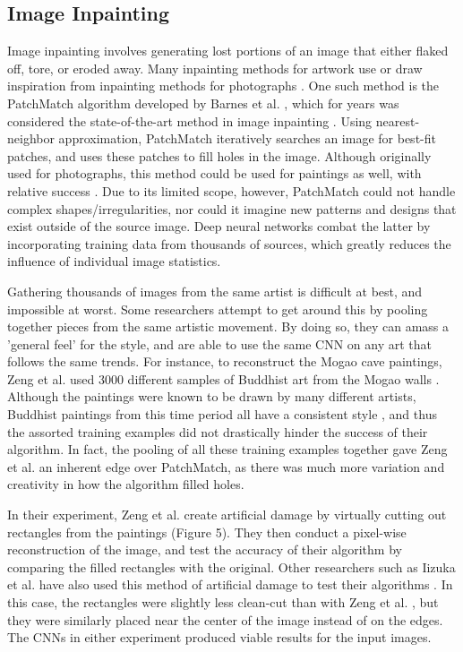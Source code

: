 \documentclass[a4paper,11pt]{article}
\begin{document}
\subsection{Image Inpainting}

Image inpainting involves generating lost portions of an image that either flaked off, tore, or eroded away. Many inpainting methods for artwork use or draw inspiration from inpainting methods for photographs \cite{gupta}. One such method is the PatchMatch algorithm developed by Barnes et al. \cite{barnes}, which for years was considered the state-of-the-art method in image inpainting \cite{gupta}. Using nearest-neighbor approximation, PatchMatch iteratively searches an image for best-fit patches, and uses these patches to fill holes in the image. Although originally used for photographs, this method could be used for paintings as well, with relative success \cite{gupta}. Due to its limited scope, however, PatchMatch could not handle complex shapes/irregularities, nor could it imagine new patterns and designs that exist outside of the source image. Deep neural networks combat the latter by incorporating training data from thousands of sources, which greatly reduces the influence of individual image statistics. 

Gathering thousands of images from the same artist is difficult at best, and impossible at worst. Some researchers attempt to get around this by pooling together pieces from the same artistic movement. By doing so, they can amass a 'general feel' for the style, and are able to use the same CNN on any art that follows the same trends. For instance, to reconstruct the Mogao cave paintings, Zeng et al. used 3000 different samples of Buddhist art from the Mogao walls \cite{zenggongzeng}. Although the paintings were known to be drawn by many different artists, Buddhist paintings from this time period all have a consistent style \cite{li}, and thus the assorted training examples did not drastically hinder the success of their algorithm. In fact, the pooling of all these training examples together gave Zeng et al. an inherent edge over PatchMatch, as there was much more variation and creativity in how the algorithm filled holes. 

In their experiment, Zeng et al. create artificial damage by virtually cutting out rectangles from the paintings (Figure 5). They then conduct a pixel-wise reconstruction of the image, and test the accuracy of their algorithm by comparing the filled rectangles with the original. Other researchers such as Iizuka et al. have also used this method of artificial damage to test their algorithms \cite{iizuka}. In this case, the rectangles were slightly less clean-cut than with Zeng et al. \cite{zenggongzeng}, but they were similarly placed near the center of the image instead of on the edges. The CNNs in either experiment produced viable results for the input images.
\end{document}
